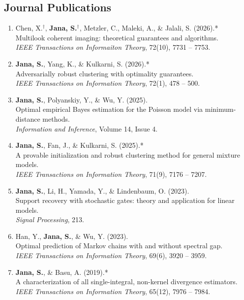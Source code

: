 \documentclass[11pt]{article}
\begin{document}
	\subsection*{Journal Publications}
	\begin{enumerate}[label=J\arabic*.]
		
		\item Chen, X.$^\dagger$, \textbf{Jana, S.}$^\dagger$, Metzler, C., Maleki, A., \& Jalali, S. (2026).* \\
		Multilook coherent imaging: theoretical guarantees and algorithms. \\
		\textit{IEEE Transactions on Informaiton Theory}, 72(10), 7731 -- 7753.
		
		\item \textbf{Jana, S.}, Yang, K., \& Kulkarni, S. (2026).* \\
		Adversarially robust clustering with optimality guarantees. \\
		\textit{IEEE Transactions on Information Theory}, 72(1), 478 -- 500.
		
		\item \textbf{Jana, S.}, Polyanskiy, Y., \& Wu, Y. (2025). \\
		Optimal empirical Bayes estimation for the Poisson model via minimum-distance methods. \\
		\textit{Information and Inference}, Volume 14, Issue 4.
		
		\item \textbf{Jana, S.}, Fan, J., \& Kulkarni, S. (2025).* \\
		A provable initialization and robust clustering method for general mixture models. \\
		\textit{IEEE Transactions on Information Theory}, 71(9), 7176 -- 7207.
		
		\item \textbf{Jana, S.}, Li, H., Yamada, Y., \& Lindenbaum, O. (2023). \\
		Support recovery with stochastic gates: theory and application for linear models. \\
		\textit{Signal Processing}, 213.
		
		\item Han, Y., \textbf{Jana, S.}, \& Wu, Y. (2023). \\
		Optimal prediction of Markov chains with and without spectral gap. \\
		\textit{IEEE Transactions on Information Theory}, 69(6), 3920 -- 3959.
		
		\item \textbf{Jana, S.}, \& Basu, A. (2019).* \\
		A characterization of all single-integral, non-kernel divergence estimators. \\
		\textit{IEEE Transactions on Information Theory}, 65(12), 7976 -- 7984.
		
	\end{enumerate}
	
\end{document}
